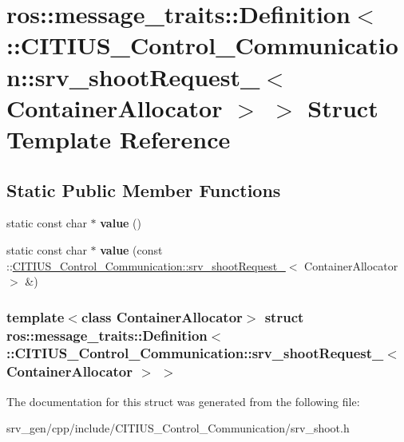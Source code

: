 \hypertarget{structros_1_1message__traits_1_1_definition_3_01_1_1_c_i_t_i_u_s___control___communication_1_1sr000021dce57f50ca4618f4efaa2e1b10}{\section{ros\-:\-:message\-\_\-traits\-:\-:\-Definition$<$ \-:\-:\-C\-I\-T\-I\-U\-S\-\_\-\-Control\-\_\-\-Communication\-:\-:srv\-\_\-shoot\-Request\-\_\-$<$ \-Container\-Allocator $>$ $>$ \-Struct \-Template \-Reference}
\label{structros_1_1message__traits_1_1_definition_3_01_1_1_c_i_t_i_u_s___control___communication_1_1sr000021dce57f50ca4618f4efaa2e1b10}
}
\subsection*{\-Static \-Public \-Member \-Functions}
\begin{DoxyCompactItemize}
\item 
\hypertarget{structros_1_1message__traits_1_1_definition_3_01_1_1_c_i_t_i_u_s___control___communication_1_1sr000021dce57f50ca4618f4efaa2e1b10_a1a80517f9328727c89e22dca9cd62179}{static const char $\ast$ {\bfseries value} ()}\label{structros_1_1message__traits_1_1_definition_3_01_1_1_c_i_t_i_u_s___control___communication_1_1sr000021dce57f50ca4618f4efaa2e1b10_a1a80517f9328727c89e22dca9cd62179}

\item 
\hypertarget{structros_1_1message__traits_1_1_definition_3_01_1_1_c_i_t_i_u_s___control___communication_1_1sr000021dce57f50ca4618f4efaa2e1b10_a3ba59563309176c15d09baf0003cbbac}{static const char $\ast$ {\bfseries value} (const \-::\hyperlink{struct_c_i_t_i_u_s___control___communication_1_1srv__shoot_request__}{\-C\-I\-T\-I\-U\-S\-\_\-\-Control\-\_\-\-Communication\-::srv\-\_\-shoot\-Request\-\_\-}$<$ \-Container\-Allocator $>$ \&)}\label{structros_1_1message__traits_1_1_definition_3_01_1_1_c_i_t_i_u_s___control___communication_1_1sr000021dce57f50ca4618f4efaa2e1b10_a3ba59563309176c15d09baf0003cbbac}

\end{DoxyCompactItemize}
\subsubsection*{template$<$class Container\-Allocator$>$ struct ros\-::message\-\_\-traits\-::\-Definition$<$ \-::\-C\-I\-T\-I\-U\-S\-\_\-\-Control\-\_\-\-Communication\-::srv\-\_\-shoot\-Request\-\_\-$<$ Container\-Allocator $>$ $>$}



\-The documentation for this struct was generated from the following file\-:\begin{DoxyCompactItemize}
\item 
srv\-\_\-gen/cpp/include/\-C\-I\-T\-I\-U\-S\-\_\-\-Control\-\_\-\-Communication/srv\-\_\-shoot.\-h\end{DoxyCompactItemize}
